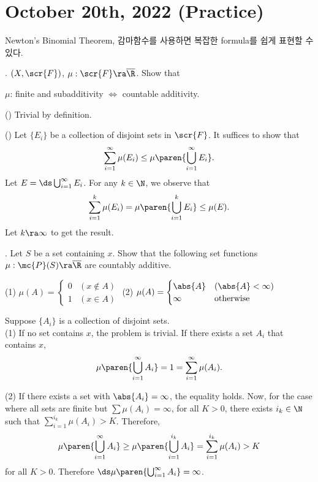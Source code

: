 \section*{October 20th, 2022 (Practice)}

 Newton's Binomial Theorem, 감마함수를 사용하면 복잡한 formula를 쉽게 표현할 수 있다.

\prob. \((X, \scr{F})\), \(\mu: \scr{F} \ra \overline{\R}\). Show that
\begin{center}
    \(\mu\): finite and subadditivity \(\iff\) countable additivity.
\end{center}

\pf (\mimpd) Trivial by definition.

(\mimp) Let \(\{E_i\}\) be a collection of disjoint sets in \(\scr{F}\). It suffices to show that
\[
    \sum_{i=1}^\infty \mu(E_i) \leq \mu \paren{\bigcup_{i=1}^\infty E_i}.
\]
Let \(E = \ds\bigcup_{i=1}^\infty E_i\). For any \(k \in \N\), we observe that
\[
    \sum_{i=1}^k \mu(E_i) = \mu\paren{\bigcup_{i=1}^k E_i} \leq \mu(E).
\]
Let \(k \ra \infty\) to get the result.

\prob. Let \(S\) be a set containing \(x\). Show that the following set functions \(\mu: \mc{P}(S) \ra \overline{\R}\) are countably additive.
\begin{center}
    (1) \quad \(\mu(A) = \begin{cases}
        0 & (x \notin A) \\ 1 & (x \in A)
    \end{cases}\) \qquad \qquad
    (2) \quad \(\mu(A) = \begin{cases}
        \abs{A} & (\abs{A} < \infty) \\ \infty & \text{otherwise}
    \end{cases}\)
\end{center}

\pf Suppose \(\{A_i\}\) is a collection of disjoint sets.\\
(1) If no set contains \(x\), the problem is trivial. If there exists a set \(A_i\) that contains \(x\),
\[
    \mu\paren{\bigcup_{i=1}^\infty A_i} = 1 = \sum_{i=1}^\infty \mu(A_i).
\]

(2) If there exists a set with \(\abs{A_i} = \infty\), the equality holds. Now, for the case where all sets are finite but \(\sum \mu(A_i) = \infty\), for all \(K > 0\), there exists \(i_k \in \N\) such that \(\sum_{i=1}^{i_k} \mu(A_i) > K\). Therefore,
\[
    \mu\paren{\bigcup_{i=1}^\infty A_i} \geq \mu\paren{\bigcup_{i=1}^{i_k} A_i} = \sum_{i=1}^{i_k} \mu(A_i) > K
\]
for all \(K > 0\). Therefore \(\ds \mu\paren{\bigcup_{i=1}^\infty A_i} = \infty\).


\pagebreak
